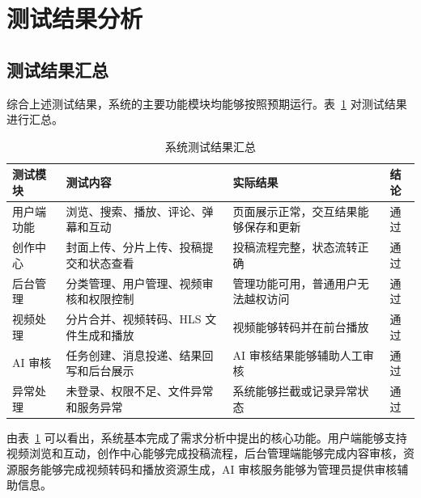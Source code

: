 \section{测试结果分析}
\label{sec:test-result-analysis}

\subsection{测试结果汇总}
\label{subsec:test-result-summary}

综合上述测试结果，系统的主要功能模块均能够按照预期运行。表~\ref{tab:test-result-summary} 对测试结果进行汇总。

\begin{table}[!htbp]
  \centering
  \caption{系统测试结果汇总}
  \label{tab:test-result-summary}
  \begin{tabular}{p{}p{}p{}p{}}
    \hline
    \textbf{测试模块} & \textbf{测试内容} & \textbf{实际结果} & \textbf{结论} \\
    \hline
    用户端功能 & 浏览、搜索、播放、评论、弹幕和互动 & 页面展示正常，交互结果能够保存和更新 & 通过 \\
    创作中心 & 封面上传、分片上传、投稿提交和状态查看 & 投稿流程完整，状态流转正确 & 通过 \\
    后台管理 & 分类管理、用户管理、视频审核和权限控制 & 管理功能可用，普通用户无法越权访问 & 通过 \\
    视频处理 & 分片合并、视频转码、HLS 文件生成和播放 & 视频能够转码并在前台播放 & 通过 \\
    AI 审核 & 任务创建、消息投递、结果回写和后台展示 & AI 审核结果能够辅助人工审核 & 通过 \\
    异常处理 & 未登录、权限不足、文件异常和服务异常 & 系统能够拦截或记录异常状态 & 通过 \\
    \hline
  \end{tabular}
\end{table}

由表~\ref{tab:test-result-summary} 可以看出，系统基本完成了需求分析中提出的核心功能。用户端能够支持视频浏览和互动，创作中心能够完成投稿流程，后台管理端能够完成内容审核，资源服务能够完成视频转码和播放资源生成，AI 审核服务能够为管理员提供审核辅助信息。
